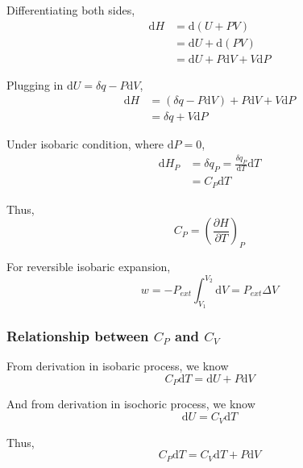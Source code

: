 \documentclass[letterpaper]{article}
\newcommand{\diff}{\mathrm{d}}
\begin{document}
Differentiating both sides,
\begin{equation*}
    \begin{aligned}
        \diff H&=\diff (U+PV)\\
        &=\diff U+\diff (PV)\\
        &=\diff U+P\diff V+V\diff P
    \end{aligned}
\end{equation*}

Plugging in $\diff U=\delta q-P\diff V$,
\begin{equation*}
    \begin{aligned}
        \diff H&=(\delta q-P\diff V)+P\diff V+V\diff P\\
        &=\delta q+V\diff P
    \end{aligned}
\end{equation*}

Under isobaric condition, where $\diff P=0$,
\begin{equation*}
    \begin{aligned}
        \diff H_P&=\delta q_P=\frac{\delta q_P}{\diff T}\diff T\\
        &=C_P\diff T
    \end{aligned}
\end{equation*}

Thus,
\begin{equation*}
    \boxed{C_P=(\frac{\partial H}{\partial T})_P}
\end{equation*}

For reversible isobaric expansion,
\begin{equation*}
    w=-P_{ext}\int_{V_1}^{V_2}\diff V=P_{ext}\Delta V
\end{equation*}
\subsubsection*{Relationship between $C_P$ and $C_V$}
From derivation in isobaric process, we know
\begin{equation*}
    C_P\diff T=\diff U+P\diff V
\end{equation*}

And from derivation in isochoric process, we know
\begin{equation*}
    \diff U=C_V\diff T
\end{equation*}

Thus,
\begin{equation*}
    C_P\diff T=C_V\diff T+P\diff V
\end{equation*}
\end{document}
